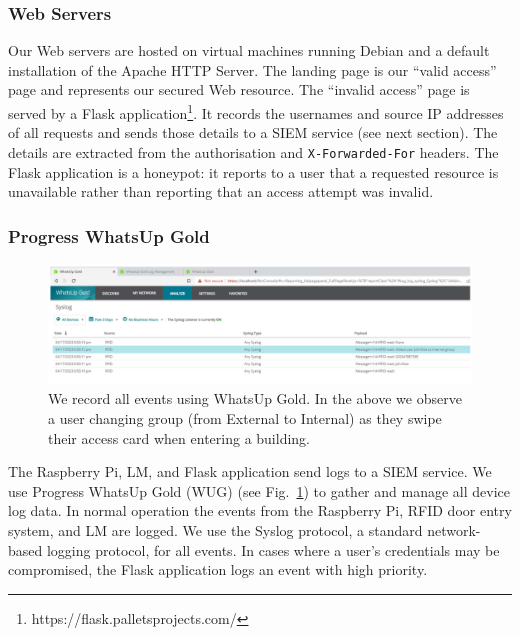 \subsubsection{Web Servers}

Our Web servers are hosted on virtual machines running Debian and a
default installation of the Apache HTTP Server.  The landing page is
our ``valid access'' page and represents our secured Web resource.
The ``invalid access'' page is served by a Flask
application\footnote{https://flask.palletsprojects.com/}.  It records
the usernames and source IP addresses of all requests and sends those
details to a SIEM service (see next section).  The details are
extracted from the authorisation and \texttt{X-Forwarded-For} headers.
The Flask application is a honeypot: it reports to a user that a
requested resource is unavailable rather than reporting that an access
attempt was invalid.

\subsubsection{Progress WhatsUp Gold}\label{sec:wug}

\begin{figure}
  \centerline{\includegraphics[width=\textwidth]{img/whatsup-gold}}
  \caption{We record all events using WhatsUp Gold.  In the above we
    observe a user changing group (from External to Internal) as they
    swipe their access card when entering a
    building.}\label{fig:whatsup-gold}
\end{figure}

The Raspberry Pi, LM, and Flask application send logs to a SIEM
service.  We use Progress WhatsUp Gold (WUG) (see
Fig.~\ref{fig:whatsup-gold}) to gather and manage all device log data.
In normal operation the events from the Raspberry Pi, RFID door entry
system, and LM are logged.  We use the Syslog protocol, a standard
network-based logging protocol, for all events.  In cases where a
user's credentials may be compromised, the Flask application logs an
event with high priority.
